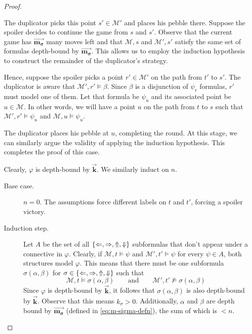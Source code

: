 \documentclass[a4paper,UKenglish,cleveref, autoref, thm-restate, numberwithinsect]{lipics-v2021}
\def\Larrow{\ensuremath\mathord{\Leftarrow}}
\def\Rarrow{\ensuremath\mathord{\Rightarrow}}
\def\Uarrow{\ensuremath\mathord{\Uparrow}}
\def\Darrow{\ensuremath\mathord{\Downarrow}}
\newcommand{\myvec}[1]{\overrightarrow{\mathbf{#1}}}
\begin{document}
\begin{proof}
\begin{description}
            The duplicator picks this point $s' \in \mathcal{M}'$ and places his pebble there. Suppose the spoiler decides to continue the game from $s$ and $s'$. Observe that the current game has $\myvec{m_\sigma}$ many moves left and that $\mathcal{M}, s$ and $\mathcal{M}', s'$ satisfy the same set of formulas depth-bound by $\myvec{m_\sigma}$. This allows us to employ the induction hypothesis to construct the remainder of the duplicator's strategy.

            Hence, suppose the spoiler picks a point $r' \in \mathcal{M}'$ on the path from $t'$ to $s'$. The duplicator is aware that $\mathcal{M}', r' \vDash \beta$. Since $\beta$ is a disjunction of $\psi_r$ formulas, $r'$ must model one of them. Let that formula be $\psi_u$ and its associated point be $u \in \mathcal{M}$. In other words, we will have a point $u$ on the path from $t$ to $s$ such that $\mathcal{M}', r' \vDash \psi_u$ and $\mathcal{M}, u \vDash \psi_u$.

            The duplicator places his pebble at $u$, completing the round. At this stage, we can similarly argue the validity of applying the induction hypothesis. This completes the proof of this case.
    \end{description}

     Clearly, $\varphi$ is depth-bound by $\myvec{k}$. We similarly induct on $n$.

    \begin{description}
        \item[Base case.] $n = 0$. The assumptions force different labels on $t$ and $t'$, forcing a spoiler victory.
        \item[Induction step.]
            Let $A$ be the set of all $\{\Larrow, \Rarrow, \Uarrow, \Darrow\}$ subformulas that don't appear under a connective in $\varphi$. Clearly, if $\mathcal{M}, t \vDash \psi$ and $\mathcal{M}', t' \vDash \psi$ for every $\psi \in A$, both structures model $\varphi$. This means that there must be one subformula $\sigma(\alpha, \beta)$ for $\sigma \in \{\Larrow, \Rarrow, \Uarrow, \Darrow\}$ such that
            \begin{equation*}
                \mathcal{M}, t \vDash \sigma(\alpha, \beta) \qquad \text{and} \qquad \mathcal{M}', t' \nvDash \sigma(\alpha, \beta)
            \end{equation*}
            Since $\varphi$ is depth-bound by $\myvec{k}$, it follows that $\sigma(\alpha, \beta)$ is also depth-bound by $\myvec{k}$. Observe that this means $k_\sigma > 0$. Additionally, $\alpha$ and $\beta$ are depth bound by $\myvec{m_\sigma}$ (defined in \eqref{eq:m-sigma-defn}), the sum of which is $< n$.


\end{description}
\end{proof}
\end{document}
